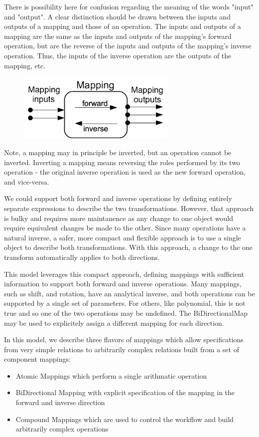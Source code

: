   There is possibility here for confusion regarding the meaning of the words "input" and "output". A clear distinction should be drawn between the inputs and outputs of a mapping and those of an operation. The inputs and outputs of a mapping are the same as the inputs and outputs of the mapping's forward operation, but are the reverse of the inputs and outputs of the mapping's inverse operation. Thus, the inputs of the inverse operation are the outputs of the mapping, etc. 

  \begin{figure}[h]
  \begin{center}
    \includegraphics[width=3in]{diagrams/mappings_flow.png}
  \end{center}
  \end{figure}

  Note, a mapping may in principle be inverted, but an operation cannot be inverted. Inverting a mapping means reversing the roles performed by its two operation - the original inverse operation is used as the new forward operation, and vice-versa. 

  We could support both forward and inverse operations by defining entirely separate expressions to describe the two transformations. However, that approach is bulky and requires more maintanence as any change to one object would require equivalent changes be made to the other. Since many operations have a natural inverse, a safer, more compact and flexible approach is to use a single object to describe both transformations. With this approach, a change to the one transform automatically applies to both directions. 

  This model leverages this compact approach, defining mappings with sufficient information to support both forward and inverse operations. Many mappings, such as shift, and rotation, have an analytical inverse, and both operations can be supported by a single set of parameters. For others, like polynomial, this is not true and so one of the two operations may be undefined. The BiDirectionalMap may be used to explicitely assign a different mapping for each direction. 

  In this model, we describe three flavors of mappings which allow specifications from very simple relations to arbitrarily complex relations built from a set of component mappings: 
  \begin{itemize}
  \item Atomic Mappings which perform a single arithmatic operation 
  \item BiDirectional Mapping with explicit specification of the mapping in the forward and inverse direction
  \item Compound Mappings which are used to control the workflow and build arbitrarily complex operations
  \end{itemize}

